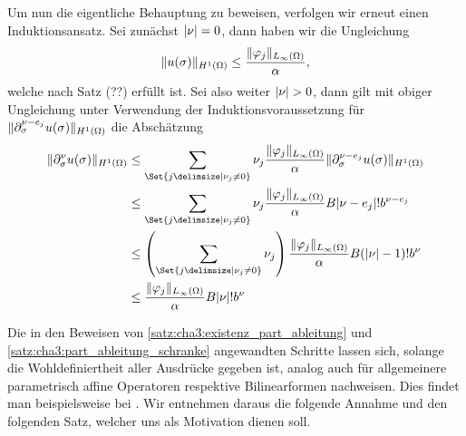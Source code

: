 \begin{Satz}
\begin{Beweis}
        Um nun die eigentliche Behauptung zu beweisen, verfolgen wir erneut einen Induktionsansatz.
        Sei zunächst $\lvert\nu\rvert = 0$, dann haben wir die Ungleichung
        \begin{equation}
            \lVert u(\sigma)\rVert_{H^{1}(\Omega)} \leq \frac{\lVert\varphi_{j}\rVert_{L_{\infty}(\Omega)}}{\alpha},
        \end{equation}
        welche nach Satz (??) erfüllt ist.
        Sei also weiter $\lvert\nu\rvert > 0$, dann gilt mit obiger Ungleichung unter Verwendung der Induktionsvoraussetzung für $\lVert\partial^{\nu - e_{j}}_{\sigma} u(\sigma)\rVert_{H^{1}(\Omega)}$ die Abschätzung
        \begin{align}
            \norm{\partial^{\nu}_{\sigma} u(\sigma)}_{H^{1}(\Omega)}
            &\leq
            \sum_{\Set{j \given \nu_{j} \neq 0}} \nu_{j} \frac{\norm{\varphi_{j}}_{L_{\infty}(\Omega)}}{\alpha} \norm{\partial^{\nu - e_{j}}_{\sigma} u(\sigma)}_{H^{1}(\Omega)}
            \\&\leq
            \sum_{\Set{j \given \nu_{j} \neq 0}} \nu_{j} \frac{\norm{\varphi_{j}}_{L_{\infty}(\Omega)}}{\alpha} B \abs{\nu - e_{j}}! b^{\nu - e_{j}}
            \\&\leq
            \left( \sum_{\Set{j \given \nu_{j} \neq 0}} \nu_{j} \right)  \frac{\norm{\varphi_{j}}_{L_{\infty}(\Omega)}}{\alpha} B (\abs{\nu} - 1)! b^{\nu}
            \\&\leq
            \frac{\norm{\varphi_{j}}_{L_{\infty}(\Omega)}}{\alpha} B \abs{\nu}! b^{\nu}
        \end{align}
    \end{Beweis}
\end{Satz}


Die in den Beweisen von \cref{satz:cha3:existenz_part_ableitung} und \cref{satz:cha3:part_ableitung_schranke} angewandten Schritte lassen sich, solange die Wohldefiniertheit aller Ausdrücke gegeben ist, analog auch für allgemeinere parametrisch affine Operatoren respektive Bilinearformen nachweisen.
Dies findet man beispielsweise bei \textcite{Kunoth:2013ef}.
Wir entnehmen daraus die folgende Annahme und den folgenden Satz, welcher uns als Motivation dienen soll.


